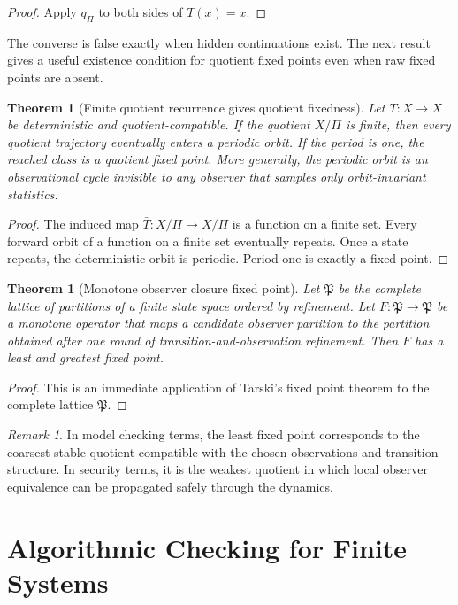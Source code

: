 \documentclass[11pt]{article}
\theoremstyle{definition}
\theoremstyle{plain}
\newtheorem{theorem}[definition]{Theorem}
\theoremstyle{remark}
\newtheorem{remark}[definition]{Remark}
\begin{document}
\begin{proof}
Apply $q_{\Pi}$ to both sides of $T(x)=x$.
\end{proof}

The converse is false exactly when hidden continuations exist. The next result gives a useful existence condition for quotient fixed points even when raw fixed points are absent.

\begin{theorem}[Finite quotient recurrence gives quotient fixedness]
Let $T:X\to X$ be deterministic and quotient-compatible. If the quotient $X/\Pi$ is finite, then every quotient trajectory eventually enters a periodic orbit. If the period is one, the reached class is a quotient fixed point. More generally, the periodic orbit is an observational cycle invisible to any observer that samples only orbit-invariant statistics.
\end{theorem}

\begin{proof}
The induced map $\bar T:X/\Pi\to X/\Pi$ is a function on a finite set. Every forward orbit of a function on a finite set eventually repeats. Once a state repeats, the deterministic orbit is periodic. Period one is exactly a fixed point.
\end{proof}

\begin{theorem}[Monotone observer closure fixed point]
Let $\mathfrak{P}$ be the complete lattice of partitions of a finite state space ordered by refinement. Let $F:\mathfrak{P}\to\mathfrak{P}$ be a monotone operator that maps a candidate observer partition to the partition obtained after one round of transition-and-observation refinement. Then $F$ has a least and greatest fixed point.
\end{theorem}

\begin{proof}
This is an immediate application of Tarski's fixed point theorem to the complete lattice $\mathfrak{P}$.
\end{proof}

\begin{remark}
In model checking terms, the least fixed point corresponds to the coarsest stable quotient compatible with the chosen observations and transition structure. In security terms, it is the weakest quotient in which local observer equivalence can be propagated safely through the dynamics.
\end{remark}

\section{Algorithmic Checking for Finite Systems}
\label{sec:finitechecking}
\end{document}
